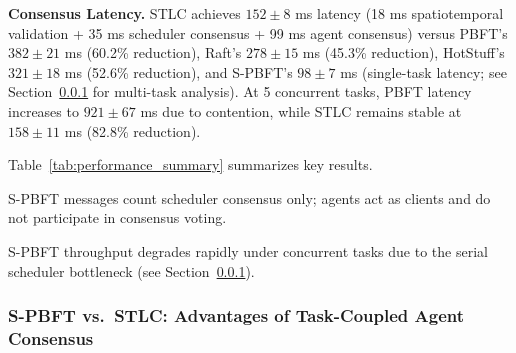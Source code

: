 \documentclass[manuscript,screen,review]{acmart}
\newenvironment{tablenotes}{%
    \par\footnotesize
    \begin{list}{}{%
        \setlength{\leftmargin}{1.5em}%
        \setlength{\labelsep}{0.5em}%
        \setlength{\itemsep}{0pt}%
        \setlength{\parsep}{0pt}%
    }%
}{%
    \end{list}%
}
\begin{document}
\textbf{Consensus Latency.} STLC achieves $152 \pm 8$ ms latency (18 ms spatiotemporal validation + 35 ms scheduler consensus + 99 ms agent consensus) versus PBFT's $382 \pm 21$ ms (60.2\% reduction), Raft's $278 \pm 15$ ms (45.3\% reduction), HotStuff's $321 \pm 18$ ms (52.6\% reduction), and S-PBFT's $98 \pm 7$ ms (single-task latency; see Section~\ref{sec:spbft_analysis} for multi-task analysis). At 5 concurrent tasks, PBFT latency increases to $921 \pm 67$ ms due to contention, while STLC remains stable at $158 \pm 11$ ms (82.8\% reduction).

Table~\ref{tab:performance_summary} summarizes key results.

\begin{table}[h]
\centering
\caption{Performance Summary ($k=3$, $m=4$, $|N|=30$, Single Task)}
\label{tab:performance_summary}
\small
{}
\begin{tablenotes}
\small
\item[$\dagger$] S-PBFT messages count scheduler consensus only; agents act as clients and do not participate in consensus voting.
\item[$\ddagger$] S-PBFT throughput degrades rapidly under concurrent tasks due to the serial scheduler bottleneck (see Section~\ref{sec:spbft_analysis}).
\end{tablenotes}
\end{table}

\subsubsection{S-PBFT vs.\ STLC: Advantages of Task-Coupled Agent Consensus}
\label{sec:spbft_analysis}
\end{document}
